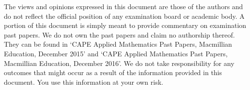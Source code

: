 The views and opinions expressed in this document are those of the authors
and do not reflect the official position of any examination board or
academic body.  A portion of this document is simply meant to provide
commentary on examination past papers. We do not own the past papers and
claim no authorship thereof. They can be found in 
‘CAPE \textsuperscript{\textregistered} Applied Mathematics Past Papers,
Macmillian Education, December 2015’ and ‘CAPE
\textsuperscript{\textregistered} Applied Mathematics Past Papers,
Macmillian Education, December 2016’. We do not take responsibility
for any outcomes that might occur as a result of the information
provided in this document. You use this information at your own risk.
